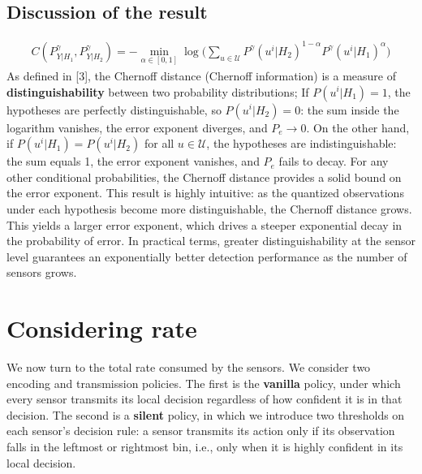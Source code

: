 \documentclass[11pt]{article}
\begin{document}
\subsection*{Discussion of the result}
\begin{align}
    C(P^\gamma_{Y|H_1},P^\gamma_{Y|H_2}) = -\min_{\alpha \in [0,1]}\log\bigg(\sum_{u \in \mathcal{U}} P^{\gamma}(u^i|H_2)^{1-\alpha}P^{\gamma}(u^i|H_1)^{\alpha}\bigg) \label{eq:chernoff-distance}
\end{align}
As defined in [3], the Chernoff distance (Chernoff information) is a measure of \textbf{distinguishability} between two probability distributions;\newline
If $P(u^i|H_1) = 1$, the hypotheses are perfectly distinguishable, so $P(u^i|H_2) = 0$: the sum inside the logarithm vanishes, the error exponent diverges, and $P_e \to 0$.\newline
On the other hand, if $P(u^i|H_1) = P(u^i|H_2)$ for all $u \in \mathcal{U}$, the hypotheses are indistinguishable: the sum equals 1, the error exponent vanishes, and $P_e$ fails to decay.\newline
For any other conditional probabilities, the Chernoff distance provides a solid bound on the error exponent.\newline
This result is highly intuitive: as the quantized observations under each hypothesis become more distinguishable, the Chernoff distance grows. This yields a larger error exponent, which drives a steeper exponential decay in the probability of error. In practical terms, greater distinguishability at the sensor level guarantees an exponentially better detection performance as the number of sensors grows.
\newpage
\section{Considering rate}
We now turn to the total rate consumed by the sensors. We consider two encoding and transmission policies. The first is the \textbf{vanilla} policy, under which every sensor transmits its local decision regardless of how confident it is in that decision. The second is a \textbf{silent} policy, in which we introduce two thresholds on each sensor's decision rule: a sensor transmits its action only if its observation falls in the leftmost or rightmost bin, i.e., only when it is highly confident in its local decision.
\end{document}
